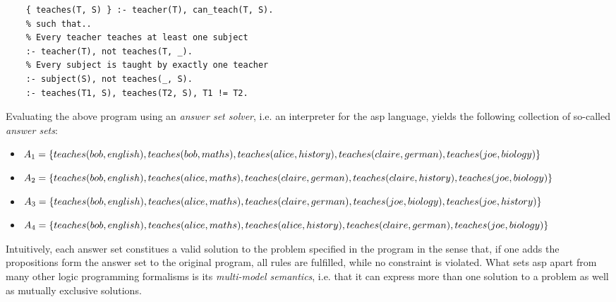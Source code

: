 \begin{example}
\begin{lstlisting}[style=asp-code, caption=School planning in ASP, label={lst:school-planning}]
    % Assign subjects to teachers
    { teaches(T, S) } :- teacher(T), can_teach(T, S).
    % such that..
    % Every teacher teaches at least one subject
    :- teacher(T), not teaches(T, _).
    % Every subject is taught by exactly one teacher
    :- subject(S), not teaches(_, S).
    :- teaches(T1, S), teaches(T2, S), T1 != T2.
\end{lstlisting}    
Evaluating the above program using an \emph{answer set solver}, i.e. an interpreter for the \gls{asp} language, yields the following collection of so-called \emph{answer sets}:
\begin{itemize}
    \item $A_1 = \{teaches(bob,english), teaches(bob,maths), teaches(alice,history),\\teaches(claire,german), teaches(joe,biology)\}$
    \item $A_2 = \{teaches(bob,english), teaches(alice,maths), teaches(claire,german),\\teaches(claire,history), teaches(joe,biology)\}$
    \item $A_3 = \{teaches(bob,english), teaches(alice,maths), teaches(claire,german),\\teaches(joe,biology), teaches(joe,history)\}$
    \item $A_4 = \{teaches(bob,english), teaches(alice,maths), teaches(alice,history),\\teaches(claire,german), teaches(joe,biology)\}$
\end{itemize}
Intuitively, each answer set constitues a valid solution to the problem specified in the program in the sense that, if one adds the propositions form the answer set to the original program, all rules are fulfilled, while no constraint is violated. What sets \gls{asp} apart from many other logic programming formalisms is its \emph{multi-model semantics}, i.e. that it can express more than one solution to a problem as well as mutually exclusive solutions.
\end{example}    



